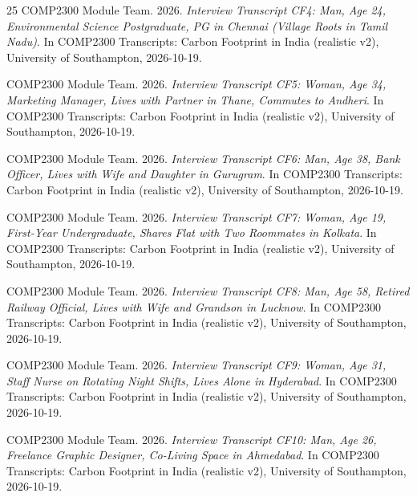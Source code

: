 \documentclass[12pt, a4paper]{article}
\begin{document}
\begin{thebibliography}{25}
COMP2300 Module Team. 2026. \textit{Interview Transcript CF4: Man, Age 24, Environmental Science Postgraduate, PG in Chennai (Village Roots in Tamil Nadu)}. In COMP2300 Transcripts: Carbon Footprint in India (realistic v2), University of Southampton, 2026-10-19.

COMP2300 Module Team. 2026. \textit{Interview Transcript CF5: Woman, Age 34, Marketing Manager, Lives with Partner in Thane, Commutes to Andheri}. In COMP2300 Transcripts: Carbon Footprint in India (realistic v2), University of Southampton, 2026-10-19.

COMP2300 Module Team. 2026. \textit{Interview Transcript CF6: Man, Age 38, Bank Officer, Lives with Wife and Daughter in Gurugram}. In COMP2300 Transcripts: Carbon Footprint in India (realistic v2), University of Southampton, 2026-10-19.

COMP2300 Module Team. 2026. \textit{Interview Transcript CF7: Woman, Age 19, First-Year Undergraduate, Shares Flat with Two Roommates in Kolkata}. In COMP2300 Transcripts: Carbon Footprint in India (realistic v2), University of Southampton, 2026-10-19.

COMP2300 Module Team. 2026. \textit{Interview Transcript CF8: Man, Age 58, Retired Railway Official, Lives with Wife and Grandson in Lucknow}. In COMP2300 Transcripts: Carbon Footprint in India (realistic v2), University of Southampton, 2026-10-19.

COMP2300 Module Team. 2026. \textit{Interview Transcript CF9: Woman, Age 31, Staff Nurse on Rotating Night Shifts, Lives Alone in Hyderabad}. In COMP2300 Transcripts: Carbon Footprint in India (realistic v2), University of Southampton, 2026-10-19.

COMP2300 Module Team. 2026. \textit{Interview Transcript CF10: Man, Age 26, Freelance Graphic Designer, Co-Living Space in Ahmedabad}. In COMP2300 Transcripts: Carbon Footprint in India (realistic v2), University of Southampton, 2026-10-19.

\end{thebibliography}
\end{document}
